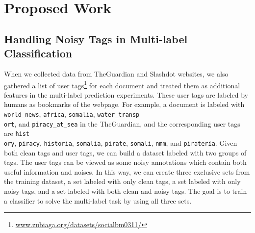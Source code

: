 \section{Proposed Work}


    
\subsection{Handling Noisy Tags in Multi-label Classification}  \label{future_noise}

When we collected data from TheGuardian and Slashdot websites, we also gathered a list of user tags\footnote{\scriptsize\url{www.zubiaga.org/datasets/socialbm0311/}} for each document and treated them as additional features in the multi-label prediction experiments. These user tags are labeled by humans as bookmarks of the webpage. For example, a document is labeled with \texttt{world\_news}, \texttt{africa}, \texttt{somalia}, \texttt{water\_transp\\ort}, and \texttt{piracy\_at\_sea} in the TheGuardian, and the corresponding user tags are \texttt{hist\\ory}, \texttt{piracy}, \texttt{historia}, \texttt{somalia}, \texttt{pirate}, \texttt{somali}, \texttt{nmm}, and \texttt{piratería}. Given both clean tags and user tags, we can build a dataset labeled with two groups of tags. The user tags can be viewed as some noisy annotations which contain both useful information and noises. In this way, we can create three exclusive sets from the training dataset, a set labeled with only clean tags, a set labeled with only noisy tags, and a set labeled with both clean and noisy tags. The goal is to train a classifier to solve the multi-label task by using all three sets.

